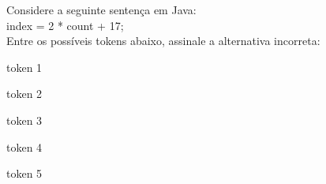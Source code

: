 \question[10]

Considere a seguinte sentença em Java:\\
index = 2 * count + 17;\\
Entre os possíveis tokens abaixo, assinale a alternativa incorreta:\\
\begin{choices}
\item token 1 
\item token 2
\item token 3 
\item token 4
\item token 5 %
\end{choices}
\answerline
